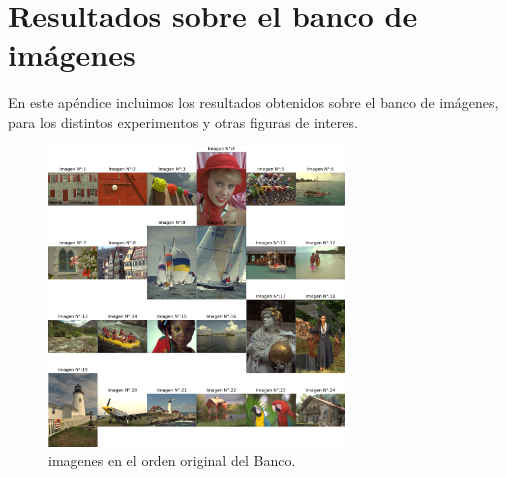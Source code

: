 \chapter{Resultados sobre el banco de im\'agenes}\label{appA}

En este ap\'endice incluimos los resultados obtenidos sobre el banco de im\'agenes, para los distintos experimentos y otras figuras de interes. 


\begin{figure}[H]
    \centering
    \includegraphics[width=0.7\textwidth]{figuras/all_images_in_order.png}
    \caption{imagenes en el orden original del Banco.}
\end{figure}


